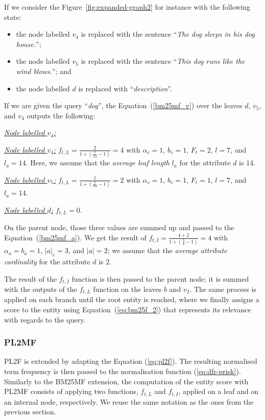 If we consider the Figure~\ref{fig:expanded-graph2} for instance with the following state:
\begin{itemize}
	\item the node labelled $v_4$ is replaced with the sentence ``\textit{The dog sleeps in his dog house.}'';
	\item the node labelled $v_5$ is replaced with the sentence ``\textit{This dog runs like the wind blows.}''; and
	\item the node labelled $d$ is replaced with ``\textit{description}''.
\end{itemize}
If we are given the query ``\textit{dog}'', the Equation~(\ref{bm25mf_v}) over the leaves $d$, $v_5$, and $v_4$ outputs the following:
\begin{labeling}{\textit{\underline{Node labelled $v_4$:}}}
	\item[\textit{\underline{Node labelled $v_4$:}}] $f_{t,L} = \frac{2}{1 + (\frac{7}{14} - 1)} = 4$ with $\alpha_v=1$, $b_v=1$, $F_t=2$, $l=7$, and $l_a=14$. Here, we assume that the \emph{average leaf length} $l_a$ for the attribute $d$ is $14$.
	\item[\textit{\underline{Node labelled $v_5$:}}] $f_{t,L} = \frac{1}{1 + (\frac{7}{14} - 1)} = 2$ with $\alpha_v=1$, $b_v=1$, $F_t=1$, $l=7$, and $l_a=14$.
	\item[\textit{\underline{Node labelled $d$:}}] $f_{t,L} = 0$.
\end{labeling}
On the parent node, those three values are summed up and passed to the Equation~(\ref{bm25mf_a}). We get the result of $f_{t,I} = \frac{4 + 2}{1 + (\frac{3}{2} - 1)} = 4$ with $\alpha_a=b_a=1$, $\left|{a}\right|_e=3$, and $\left|{a}\right| = 2$; we assume that the \emph{average attribute cardinality} for the attribute $d$ is $2$.

The result of the $f_{t,I}$ function is then passed to the parent node; it is summed with the outputs of the $f_{t,L}$ function on the leaves $b$ and $v_2$. The same process is applied on each branch until the root entity is reached, where we finally assigns a score to the entity using Equation~(\ref{eq:bm25f_2}) that represents its relevance with regards to the query.

\subsubsection{PL2MF}
\label{sec:pl2mf-function}

PL2F is extended by adapting the Equation (\ref{eq:pl2f}). The resulting normalised term frequency is then passed to the normalisation function (\ref{eq:dfr-prisk}).
Similarly to the \gls{BM25MF} extension, the computation of the entity score with \gls{PL2MF} consists of applying two functions, $f_{t,L}$ and $f_{t,I}$, applied on a leaf and on an internal node, respectively. We reuse the same notation as the ones from the previous section.\\ 

